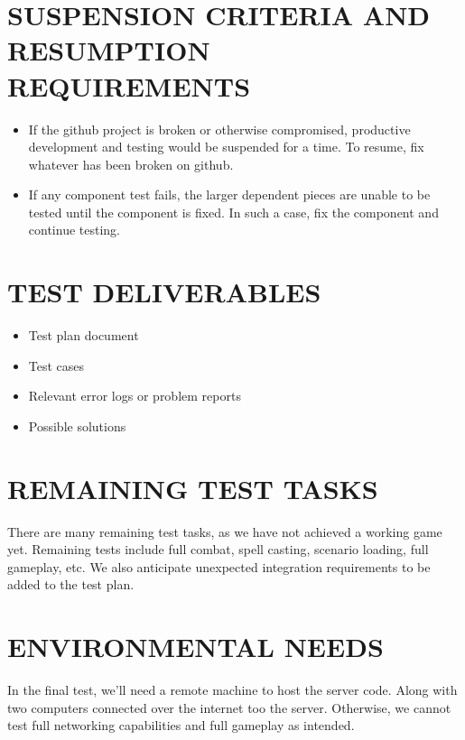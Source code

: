 \section[SUSPENSION CRITERIA]{\bfseries\color{black}
	 SUSPENSION CRITERIA AND RESUMPTION REQUIREMENTS}
{\color{black}
\begin{itemize}
\item If the github project is broken or otherwise compromised, productive development and testing would be suspended for a time. To resume, fix whatever has been broken on github.
\item If any component test fails, the larger dependent pieces are unable to be tested until the component is fixed. In such a case, fix the component and continue testing.
\end{itemize}

\section[TEST DELIVERABLES]{\bfseries\color{black} TEST DELIVERABLES}
{\color{black}
\begin{itemize}
\item Test plan document
\item Test cases
\item Relevant error logs or problem reports
\item Possible solutions
\end{itemize}
}

\section[REMAINING TEST TASKS]{\bfseries\color{black} REMAINING TEST TASKS}
{\color{black}
There are many remaining test tasks, as we have not achieved a working game yet. Remaining tests include full combat, spell casting, scenario loading, full gameplay, etc. We also anticipate unexpected integration requirements to be added to the test plan.}

\section[ENVIRONMENTAL NEEDS]{\bfseries\color{black} ENVIRONMENTAL NEEDS}
{\color{black}
In the final test, we'll need a remote machine to host the server code. Along with two computers connected over the internet too the server. Otherwise, we cannot test full networking capabilities and full gameplay as intended. 
}

}

